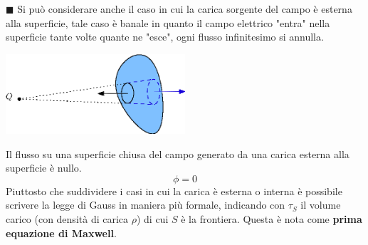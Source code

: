 \documentclass[10pt, letterpaper]{report}
\begin{document}
\hfill$\blacksquare$\acc
Si può considerare anche il caso in cui la carica sorgente del campo è esterna alla superficie, tale caso è banale in quanto il campo elettrico "entra" nella superficie tante volte quante ne "esce", ogni flusso infinitesimo si annulla.\begin{center}
    \includegraphics[width=0.5\textwidth]{images/caricaEst.eps}
\end{center}
Il flusso su una superficie chiusa del campo generato da una carica esterna alla superficie è nullo. 
$$ \phi = 0$$
Piuttosto che suddividere i casi in cui la carica è esterna o interna è possibile scrivere la legge di Gauss in maniera più formale, indicando con $\tau_S$ il volume carico (con densità di carica $\rho$) di cui $S$ è la frontiera. 
Questa è nota come \textbf{prima equazione di Maxwell}.
\end{document}
